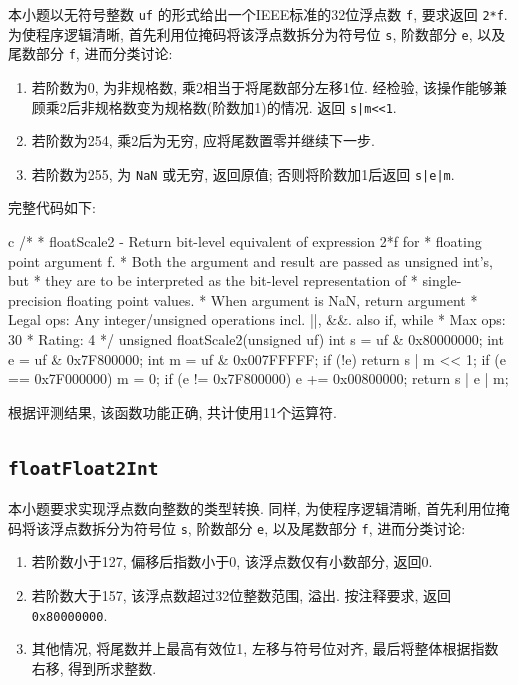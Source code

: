 本小题以无符号整数 \verb|uf| 的形式给出一个IEEE标准的32位浮点数 \verb|f|, 要求返回 \verb|2*f|. 为使程序逻辑清晰, 首先利用位掩码将该浮点数拆分为符号位 \verb|s|, 阶数部分 \verb|e|, 以及尾数部分 \verb|f|, 进而分类讨论:

\begin{enumerate}[noitemsep]
    \item 若阶数为0, 为非规格数, 乘2相当于将尾数部分左移1位. 经检验, 该操作能够兼顾乘2后非规格数变为规格数(阶数加1)的情况. 返回 \verb#s|m<<1#.
    \item 若阶数为254, 乘2后为无穷, 应将尾数置零并继续下一步.
    \item 若阶数为255, 为 \verb|NaN| 或无穷, 返回原值; 否则将阶数加1后返回 \verb#s|e|m#.
\end{enumerate}

完整代码如下:

\begin{code}{c}
/*
 * floatScale2 - Return bit-level equivalent of expression 2*f for
 *   floating point argument f.
 *   Both the argument and result are passed as unsigned int's, but
 *   they are to be interpreted as the bit-level representation of
 *   single-precision floating point values.
 *   When argument is NaN, return argument
 *   Legal ops: Any integer/unsigned operations incl. ||, &&. also if, while
 *   Max ops: 30
 *   Rating: 4
 */
unsigned floatScale2(unsigned uf) {
  int s = uf & 0x80000000;
  int e = uf & 0x7F800000;
  int m = uf & 0x007FFFFF;
  if (!e)
    return s | m << 1;
  if (e == 0x7F000000)
    m = 0;
  if (e != 0x7F800000)
    e += 0x00800000;
  return s | e | m;
}
\end{code}

根据评测结果, 该函数功能正确, 共计使用11个运算符.

\subsection{\texttt{floatFloat2Int}}

本小题要求实现浮点数向整数的类型转换. 同样, 为使程序逻辑清晰, 首先利用位掩码将该浮点数拆分为符号位 \verb|s|, 阶数部分 \verb|e|, 以及尾数部分 \verb|f|, 进而分类讨论:

\begin{enumerate}[noitemsep]
    \item 若阶数小于127, 偏移后指数小于0, 该浮点数仅有小数部分, 返回0.
    \item 若阶数大于157, 该浮点数超过32位整数范围, 溢出. 按注释要求, 返回 \verb|0x80000000|.
    \item 其他情况, 将尾数并上最高有效位1, 左移与符号位对齐, 最后将整体根据指数右移, 得到所求整数.
\end{enumerate}


